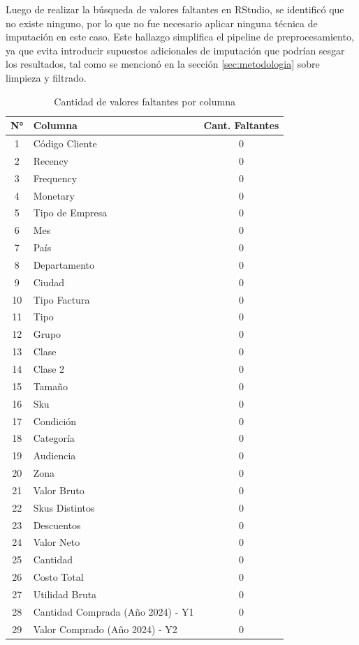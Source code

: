 Luego de realizar la búsqueda de valores faltantes en RStudio, se identificó que no existe ninguno, por lo que no fue necesario aplicar ninguna técnica de imputación en este caso. Este hallazgo simplifica el pipeline de preprocesamiento, ya que evita introducir supuestos adicionales de imputación que podrían sesgar los resultados, tal como se mencionó en la sección \ref{sec:metodologia} sobre limpieza y filtrado.
\newpage
\begin{table}[H]
\centering
\caption{Cantidad de valores faltantes por columna}
\begin{tabular}{c l c}
\hline
\textbf{N°} & \textbf{Columna} & \textbf{Cant. Faltantes} \\ \hline
1  & Código Cliente     & 0 \\
2  & Recency  & 0 \\
3  & Frequency       & 0 \\
4  & Monetary        & 0 \\
5  & Tipo de Empresa             & 0 \\
6  & Mes              & 0 \\
7  & País             & 0 \\
8 & Departamento     & 0 \\
9 & Ciudad           & 0 \\
10 & Tipo Factura     & 0 \\
11 & Tipo             & 0 \\
12 & Grupo            & 0 \\
13 & Clase        & 0 \\
14 & Clase 2           & 0 \\
15 & Tamaño           & 0 \\
16 & Sku              & 0 \\
17 & Condición             & 0 \\
18 & Categoría        & 0 \\
19 & Audiencia        & 0 \\
20 & Zona            & 0 \\
21 & Valor Bruto      & 0 \\
22 & Skus Distintos  & 0 \\
23 & Descuentos             & 0 \\
24 & Valor Neto       & 0 \\
25 & Cantidad             & 0 \\
26 & Costo Total       & 0 \\
27 & Utilidad Bruta   & 0 \\
28 & Cantidad Comprada (Año 2024)  - Y1              & 0 \\
29  & Valor Comprado (Año 2024) - Y2              & 0 \\
\hline
\end{tabular}
\end{table}

